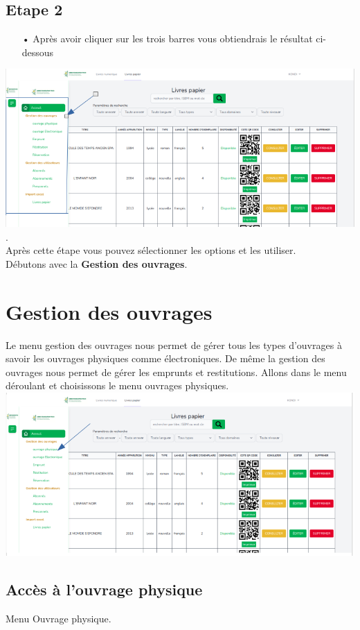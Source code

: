 \documentclass[12pt,a4paper]{article}
\begin{document}
\subsection{Etape 2}
\begin{itemize}
\item[•] Après avoir cliquer sur les trois barres vous obtiendrais le résultat ci-dessous
\end{itemize}
\includegraphics[scale=0.7]{images/TableauDeBord.png}.\\
Après cette étape vous pouvez sélectionner les options et les utiliser.\\
Débutons avec la \textbf{Gestion des ouvrages}.

\newpage
\section{Gestion des ouvrages}
Le menu gestion des ouvrages nous permet de gérer tous les types d'ouvrages à savoir les ouvrages physiques comme électroniques. De même la gestion des ouvrages nous permet de gérer les emprunts et restitutions.
Allons dans le menu déroulant et choisissons le menu ouvrages physiques. \\
\includegraphics[scale=0.7]{images/TableauDeBord2.png}

\subsection{Accès à l'ouvrage physique}
Menu Ouvrage physique.\\
\end{document}
